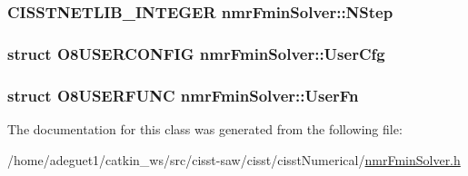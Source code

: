 \hypertarget{classnmr_fmin_solver_a597036b665386a5e4fcc0028843d1bc3}{
\subsubsection[{N\-Step}]{\setlength{\rightskip}{0pt plus 5cm}C\-I\-S\-S\-T\-N\-E\-T\-L\-I\-B\-\_\-\-I\-N\-T\-E\-G\-E\-R nmr\-Fmin\-Solver\-::\-N\-Step\hspace{0.3cm}{\ttfamily [protected]}}}\label{classnmr_fmin_solver_a597036b665386a5e4fcc0028843d1bc3}
\hypertarget{classnmr_fmin_solver_a7116a6ed46d966947aaf356e22028a5d}{
\subsubsection[{User\-Cfg}]{\setlength{\rightskip}{0pt plus 5cm}struct O8\-U\-S\-E\-R\-C\-O\-N\-F\-I\-G nmr\-Fmin\-Solver\-::\-User\-Cfg\hspace{0.3cm}{\ttfamily [protected]}}}\label{classnmr_fmin_solver_a7116a6ed46d966947aaf356e22028a5d}
\hypertarget{classnmr_fmin_solver_aae14c67da4d9b2d740a1adb8873904b3}{
\subsubsection[{User\-Fn}]{\setlength{\rightskip}{0pt plus 5cm}struct O8\-U\-S\-E\-R\-F\-U\-N\-C nmr\-Fmin\-Solver\-::\-User\-Fn\hspace{0.3cm}{\ttfamily [protected]}}}\label{classnmr_fmin_solver_aae14c67da4d9b2d740a1adb8873904b3}


The documentation for this class was generated from the following file\-:\begin{DoxyCompactItemize}
\item 
/home/adeguet1/catkin\-\_\-ws/src/cisst-\/saw/cisst/cisst\-Numerical/\hyperlink{nmr_fmin_solver_8h}{nmr\-Fmin\-Solver.\-h}\end{DoxyCompactItemize}

